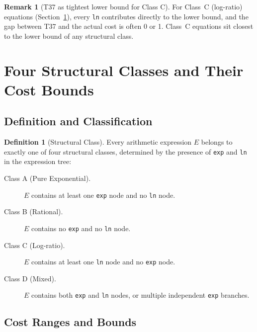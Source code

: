\documentclass[12pt,a4paper]{article}
\theoremstyle{definition}
\newtheorem{definition}[theorem]{Definition}
\newtheorem{remark}[theorem]{Remark}
\begin{document}
\begin{remark}[T37 as tightest lower bound for Class C]
For Class~C (log-ratio) equations (Section~\ref{sec:classes}), every \texttt{ln}
contributes directly to the lower bound, and the gap between T37 and the actual
cost is often 0 or 1.  Class~C equations sit closest to the lower bound of any
structural class.
\end{remark}

\section{Four Structural Classes and Their Cost Bounds}
\label{sec:classes}

\subsection{Definition and Classification}

\begin{definition}[Structural Class]
\label{def:class}
Every arithmetic expression $E$ belongs to exactly one of four structural
classes, determined by the presence of \texttt{exp} and \texttt{ln} in the
expression tree:
\begin{description}
  \item[Class A (Pure Exponential).] $E$ contains at least one \texttt{exp}
        node and no \texttt{ln} node.
  \item[Class B (Rational).] $E$ contains no \texttt{exp} and no \texttt{ln}
        node.
  \item[Class C (Log-ratio).] $E$ contains at least one \texttt{ln} node and
        no \texttt{exp} node.
  \item[Class D (Mixed).] $E$ contains both \texttt{exp} and \texttt{ln} nodes,
        or multiple independent \texttt{exp} branches.
\end{description}
\end{definition}

\subsection{Cost Ranges and Bounds}
\end{document}

